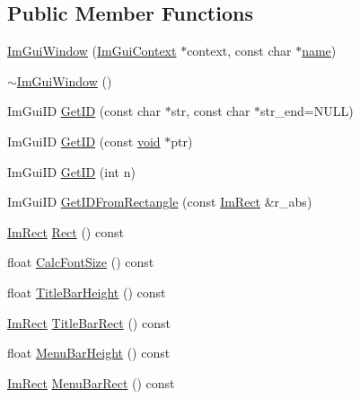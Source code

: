 \subsection*{Public Member Functions}
\begin{DoxyCompactItemize}
\item 
\hyperlink{structImGuiWindow_acd2909ae3b7079de81d528327cc11dfd}{Im\+Gui\+Window} (\hyperlink{structImGuiContext}{Im\+Gui\+Context} $\ast$context, const char $\ast$\hyperlink{imgui__impl__opengl3__loader_8h_a5c4947d4516dd7cfa3505ce3a648a4ef}{name})
\item 
\hyperlink{structImGuiWindow_a8e81d730c3a39a71e6b6ca4654451c53}{$\sim$\+Im\+Gui\+Window} ()
\item 
Im\+Gui\+ID \hyperlink{structImGuiWindow_a66400a63bc0b54d7d29e08d1b1b1a42b}{Get\+ID} (const char $\ast$str, const char $\ast$str\+\_\+end=N\+U\+LL)
\item 
Im\+Gui\+ID \hyperlink{structImGuiWindow_aae21dffb343cabca9414499b827912a8}{Get\+ID} (const \hyperlink{imgui__impl__opengl3__loader_8h_ac668e7cffd9e2e9cfee428b9b2f34fa7}{void} $\ast$ptr)
\item 
Im\+Gui\+ID \hyperlink{structImGuiWindow_a122c47ded974724a192912883fb8e0e9}{Get\+ID} (int n)
\item 
Im\+Gui\+ID \hyperlink{structImGuiWindow_a44931b6e73248930490d2c89377a8233}{Get\+I\+D\+From\+Rectangle} (const \hyperlink{structImRect}{Im\+Rect} \&r\+\_\+abs)
\item 
\hyperlink{structImRect}{Im\+Rect} \hyperlink{structImGuiWindow_a147da28bf5d167cbe0a363c4a578dea1}{Rect} () const
\item 
float \hyperlink{structImGuiWindow_a6881ed65e208fb6e015d3ae6bccfc794}{Calc\+Font\+Size} () const
\item 
float \hyperlink{structImGuiWindow_ad1580cc8b5bdf981c6ed2eb22ecd7dbb}{Title\+Bar\+Height} () const
\item 
\hyperlink{structImRect}{Im\+Rect} \hyperlink{structImGuiWindow_a06884e1bc80e460e51e1626b5b976196}{Title\+Bar\+Rect} () const
\item 
float \hyperlink{structImGuiWindow_acfb8bdad2e3ea6102589813ae32d0364}{Menu\+Bar\+Height} () const
\item 
\hyperlink{structImRect}{Im\+Rect} \hyperlink{structImGuiWindow_a59df76c1445aaaf0b43456c83c1a88e5}{Menu\+Bar\+Rect} () const
\end{DoxyCompactItemize}
